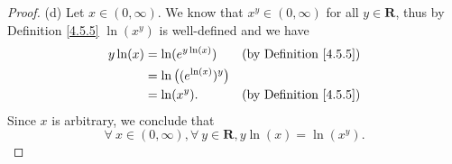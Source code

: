 \begin{proof}{(d)}
    Let \(x \in (0, \infty)\).
    We know that \(x^y \in (0, \infty)\) for all \(y \in \mathbf{R}\), thus by Definition \ref{4.5.5} \(\ln(x^y)\) is well-defined and we have
    \begin{align*}
        y \ln(x) & = \ln(e^{y \ln(x)})             & \text{(by Definition \ref{4.5.5})} \\
                 & = \ln\big((e^{\ln(x)})^{y}\big)                                      \\
                 & = \ln(x^y).                     & \text{(by Definition \ref{4.5.5})}
    \end{align*}
    Since \(x\) is arbitrary, we conclude that
    \[
        \forall\ x \in (0, \infty), \forall\ y \in \mathbf{R}, y \ln(x) = \ln(x^y).
    \]
\end{proof}

